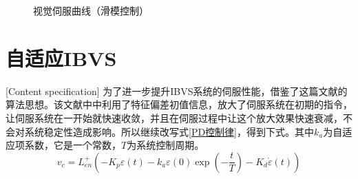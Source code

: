 \documentclass[fontset=fandol,type=bachelor,campus=harbin,bsmainpagenumberline=true]{hithesisbook}
\begin{document}
\begin{figure}[h]
{\begin{minipage}[h]{0.4\textwidth}
		\end{minipage}
		\label{视觉伺服曲线（滑模控制）c}
	}
	\caption{视觉伺服曲线（滑模控制）}
	\label{视觉伺服曲线（滑模控制）}
\end{figure}


\section{自适应IBVS}[Content specification]
为了进一步提升IBVS系统的伺服性能，借鉴了这篇文献的算法思想\cite{mansard2007task}。该文献中中利用了特征偏差初值信息，放大了伺服系统在初期的指令，让伺服系统在一开始就快速收敛，并且在伺服过程中让这个放大效果快速衰减，不会对系统稳定性造成影响。所以继续改写式\ref{PD控制律}，得到下式。其中$k_a$为自适应项系数，它是一个常数，$T$为系统控制周期。
\begin{equation}
v_c=L_{en}^{+}\left( -K_p\varepsilon\left( t \right) -k_a\varepsilon\left( 0 \right) \exp \left( -\frac{t}{T} \right) -K_d\dot{\varepsilon}\left( t \right) \right)  
\label{自适应IBVS}
\end{equation}
\end{document}
